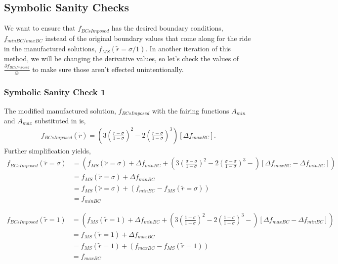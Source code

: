 \subsection{Symbolic Sanity Checks}
We want to ensure that $f_{BCsImposed}$ has the desired boundary conditions, 
$f_{minBC/maxBC}$ instead of the original boundary values that come along
for the ride in the manufactured solutions, $f_{MS}(\widetilde{r}=\sigma /1)$. 
In another iteration of this method, we will be changing the derivative values,
so let's check the values of $\frac{\partial f_{BCsImposed}}{\partial \widetilde{r}}$ 
to make sure those aren't effected unintentionally.

\subsubsection*{Symbolic Sanity Check 1}
The modified manufactured solution, $f_{BCsImposed}$ with the fairing functions
$A_{min}$ and $A_{max}$ substituted in is,
\begin{align*}
    f_{BCsImposed}(\widetilde{r}) =
    \left(
        3 \left(  \frac{\widetilde{r} - \sigma }{ 1 - \sigma}\right)^2- 
        2 \left( \frac{\widetilde{r} - \sigma}{1 - \sigma} \right)^3 
    \right)
    \left[ \Delta f_{maxBC} \right] .
\end{align*} 
Further simplification yields,
\begin{align*}
    f_{BCsImposed}(\widetilde{r} = \sigma) 
    &=
    \left(
        f_{MS}(\widetilde{r} = \sigma) +
        \Delta f_{minBC} +
        \left( 3\left(  \frac{\sigma - \sigma}{1 - \sigma} \right)^2- 
          2\left(  \frac{\sigma - \sigma}{1 - \sigma} \right)^3- 
        \right)
        \left[ \Delta f_{maxBC} - \Delta f_{minBC}  \right] 
    \right)\\
    &=  f_{MS}(\widetilde{r} = \sigma) + \Delta f_{minBC}\\
    &=  f_{MS}(\widetilde{r} = \sigma) + (f_{minBC} - f_{MS}(\widetilde{r} = \sigma)) \\
    &=  f_{minBC}
\end{align*} 


\begin{align*}
    f_{BCsImposed}(\widetilde{r} = 1 ) 
    &=
    \left(
        f_{MS}(\widetilde{r} = 1) +
        \Delta f_{minBC} +
        \left( 3\left(  \frac{1 - \sigma}{1 - \sigma} \right)^2- 
          2\left(  \frac{1 - \sigma}{1 - \sigma} \right)^3- 
        \right)
        \left[ \Delta f_{maxBC} - \Delta f_{minBC}  \right] 
    \right)\\
    &=  f_{MS}(\widetilde{r} = 1) + \Delta f_{maxBC}\\
    &=  f_{MS}(\widetilde{r} = 1) + (f_{maxBC} - f_{MS}(\widetilde{r} = 1)) \\
    &=  f_{maxBC}
\end{align*} 


